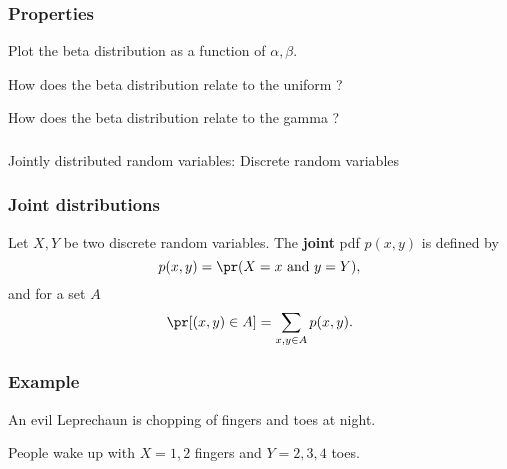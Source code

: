 \begin{frame}[fragile]\frametitle{Properties}


Plot the beta distribution as a function of $\alpha,\beta$. 

\vspace{.1in}

How does the beta distribution relate to the uniform ? 

\vspace{.1in}

How does the beta distribution relate to the gamma ? 

\end{frame}

\begin{frame}[fragile]\frametitle{}
\begin{center}
{\Large Jointly distributed random variables: Discrete random variables }

\end{center}
\end{frame}



\begin{frame}[fragile]\frametitle{Joint distributions}

\begin{defn}
Let $X,Y$ be two discrete random variables. The {\bf joint} pdf 
$p(x,y)$ is defined by
$$p(x,y) = \pr(X=x \mbox{ and } y = Y),$$ 
and for a set $A$
$$\pr[(x,y) \in A] = \sum_{x,y \in A} p(x,y).$$
\end{defn}
\end{frame}

\begin{frame}[fragile]\frametitle{Example}

An evil Leprechaun is chopping of fingers and toes at night.


People wake up with $X = 1,2$ fingers and $Y=2,3,4$
toes.

\end{frame}


